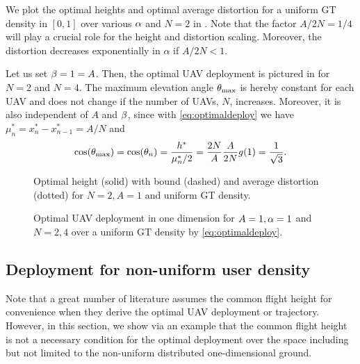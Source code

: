 \documentclass[12pt,onecolumn,journal,draftclsnofoot,letterpaper]{IEEEtran}
\newcounter{example}[section]
\newenvironment{example}[1][]{\refstepcounter{example}\par\vspace{1.5ex}\noindent{\em Example~\theexample. #1}}{\par\vspace{1.5ex}}
\newcommand{\junstart}{\color{black}}
\begin{document}
\begin{example}
We plot  the optimal heights and optimal average distortion for a uniform GT density in $[0,1]$ over various $\alpha$
and $N=2$ in . Note that the factor $A/2N=1/4$ will play a crucial role for the height and
distortion scaling. Moreover, the distortion decreases exponentially in $\alpha$ if $A/2N<1$.

Let us set $\beta=1=A$. Then, the optimal UAV deployment is pictured in  for $N=2$ and $N=4$. The
maximum elevation angle $\theta_{\text{max}}$ is hereby constant for each UAV and does not change if the number of UAVs,
$N$, increases.  Moreover, it is also independent of $A$ and $\beta$, since with \eqref{eq:optimaldeploy} we have
$\mu_n^*=x^*_n-x^*_{n-1}=A/N$ and
%
\begin{align}
  \cos(\theta_{\text{max}})=\cos(\theta_n)= \frac{h^*}{\mu^*_n/2}= \frac{2N}{A}\frac{A}{2N}   g(1)= \frac{1}{\sqrt{3}}.
\end{align}
\end{example}
% 
\begin{figure}
\begin{minipage}[b]{0.4\textwidth}
  \vspace{1ex}
\def\svgwidth{1.1\textwidth} \scriptsize{
  }
  \vspace{-3.2ex}
  \caption{{\small Optimal height (solid) with bound (dashed) and average distortion (dotted) for 
  $N=2,A=1$ and uniform GT density.}}
  \label{fig:goptdopt}
\end{minipage}
\hfill
  \begin{minipage}[b]{0.56\textwidth}
\hspace{-2ex} 
    \def\svgwidth{1.08\textwidth} \scriptsize{
      }
      \caption{{\small Optimal UAV deployment in one dimension for $A=1,\alpha=1$ and $N=2,4$ over a uniform GT density
      by \eqref{eq:optimaldeploy}.}}
      \label{fig:uavonedim}
    \end{minipage}
\end{figure}
%


\junstart
{} %
\subsection{Deployment for non-uniform user density}
%
Note that a great number of literature assumes the common flight height for convenience when they derive the optimal UAV
deployment or trajectory.  However, in this section, we show via an example that the common flight height is not a
necessary condition for the optimal deployment over the space including but not limited to the non-uniform distributed
one-dimensional ground.
\fi %
\end{document}
